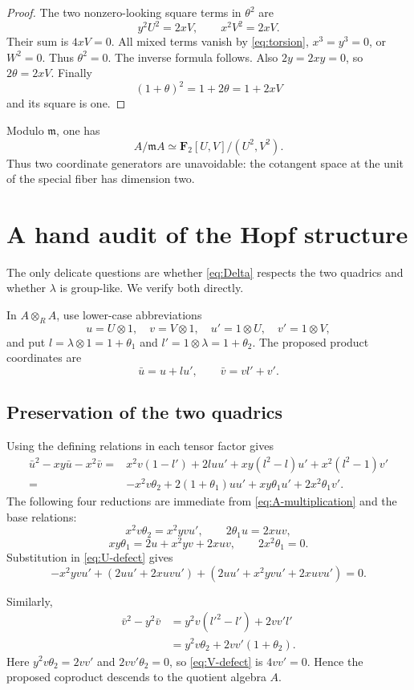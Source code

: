\documentclass[11pt]{article}
\theoremstyle{remark}
\newcommand{\F}{\mathbf F}
\newcommand{\m}{\mathfrak m}
\newcommand{\ot}{\otimes}
\begin{document}
\begin{proof}
The two nonzero-looking square terms in $\theta^2$ are
\[
 y^2U^2=2xV,
 \qquad x^2V^2=2xV.
\]
Their sum is $4xV=0$.  All mixed terms vanish by
\eqref{eq:torsion}, $x^3=y^3=0$, or $W^2=0$.  Thus $\theta^2=0$.
The inverse formula follows.  Also $2y=2xy=0$, so
$2\theta=2xV$.  Finally
\[
 (1+\theta)^2=1+2\theta=1+2xV
\]
and its square is one.
\end{proof}

Modulo $\m$, one has
\[
 A/\m A\simeq\F_2[U,V]/(U^2,V^2).
\]
Thus two coordinate generators are unavoidable: the cotangent space at the
unit of the special fiber has dimension two.

\section{A hand audit of the Hopf structure}

The only delicate questions are whether \eqref{eq:Delta} respects the two
quadrics and whether $\lambda$ is group-like.  We verify both directly.

In $A\ot_R A$, use lower-case abbreviations
\[
 u=U\ot1,\quad v=V\ot1,\quad
 u'=1\ot U,\quad v'=1\ot V,
\]
and put $l=\lambda\ot1=1+\theta_1$ and
$l'=1\ot\lambda=1+\theta_2$.  The proposed product coordinates are
\begin{equation}\label{eq:product-coordinates}
 \bar u=u+lu',
 \qquad \bar v=vl'+v'.
\end{equation}

\subsection{Preservation of the two quadrics}

Using the defining relations in each tensor factor gives
\begin{align}
 \bar u^2-xy\bar u-x^2\bar v
  ={}&x^2v(1-l')+2luu'+xy(l^2-l)u'
      +x^2(l^2-1)v'\nonumber\\
  ={}&-x^2v\theta_2+2(1+\theta_1)uu'
      +xy\theta_1u'+2x^2\theta_1v'.\label{eq:U-defect}
\end{align}
The following four reductions are immediate from
\eqref{eq:A-multiplication} and the base relations:
\[
 x^2v\theta_2=x^2yv u',
 \qquad 2\theta_1u=2xuv,
\]
\[
 xy\theta_1=2u+x^2yv+2xuv,
 \qquad 2x^2\theta_1=0.
\]
Substitution in \eqref{eq:U-defect} gives
\[
 -x^2yvu'+(2uu'+2xuvu')
 +(2uu'+x^2yvu'+2xuvu')=0.
\]

Similarly,
\begin{align}
 \bar v^2-y^2\bar v
 &=y^2v(l'^2-l')+2vv'l'\nonumber\\
 &=y^2v\theta_2+2vv'(1+\theta_2).
 \label{eq:V-defect}
\end{align}
Here $y^2v\theta_2=2vv'$ and $2vv'\theta_2=0$, so
\eqref{eq:V-defect} is $4vv'=0$.  Hence the proposed coproduct descends to
the quotient algebra $A$.
\end{document}
